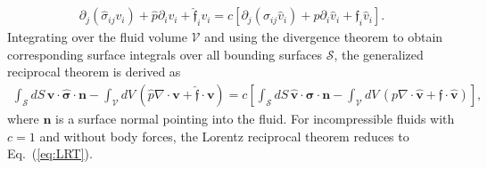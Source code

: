 \begin{align}
    \partial_j (\hat{\sigma}_{ij}v_i)+\hat{p}\partial_iv_i + \hat{\mathfrak{f}}_iv_i
    =
    c[
    \partial_j (\sigma_{ij}\hat{v}_i)+p\partial_i\hat{v}_i + \mathfrak{f}_i\hat{v}_i
    ]
    .
\end{align}
Integrating over the fluid volume $\mathcal{V}$ and using the divergence theorem to obtain corresponding surface integrals over all bounding surfaces $\mathcal{S}$, the generalized reciprocal theorem is derived as
\begin{align}
    \int_\mathcal{S} dS\,
    \mathbf{v}\cdot\hat{\boldsymbol{\sigma}}
    \cdot\mathbf{n}
    -
    \int_\mathcal{V} dV\,
    (
    \hat{p}
    \nabla\cdot\mathbf{v}
    +
    \hat{\boldsymbol{\mathfrak{f}}}
    \cdot\mathbf{v}
    )
    =
    c
    \left[
    \int_\mathcal{S} dS\,
    \hat{\mathbf{v}}\cdot\boldsymbol{\sigma}
    \cdot\mathbf{n}
    -
    \int_\mathcal{V} dV\,
    (
    p
    \nabla\cdot\hat{\mathbf{v}}
    +
    \boldsymbol{\mathfrak{f}}
    \cdot\hat{\mathbf{v}}
    )
    \right]
    ,
\end{align}
where $\mathbf{n}$ is a surface normal pointing into the fluid.
For incompressible fluids with $c=1$ and without body forces, the Lorentz reciprocal theorem reduces to Eq.~(\ref{eq:LRT}).